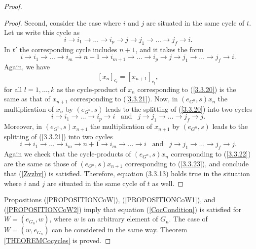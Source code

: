 \documentclass[12pt]{amsart}
\theoremstyle{definition}
\numberwithin{equation}{section}
\begin{document}
\begin{proof}
\begin{proof}
Second, consider the case where $i$ and $j$ are situated in the same cycle of $t$. Let us write this cycle as
\begin{equation}\label{3.3.20}
i\rightarrow i_1\rightarrow\ldots\rightarrow i_p\rightarrow j\rightarrow j_{1}\rightarrow
\ldots\rightarrow j_f\rightarrow i.
\end{equation}
In $t'$ the corresponding cycle includes $n+1$, and it takes the form
\begin{equation}\label{3.3.21}
i\rightarrow i_1\rightarrow\ldots\rightarrow i_{m}\rightarrow n+1\rightarrow i_{m+1}\rightarrow\ldots
\rightarrow i_p\rightarrow j\rightarrow j_{1}\rightarrow
\ldots\rightarrow j_f\rightarrow i.
\end{equation}
Again, we have
\begin{equation}
\left[x_{n}\right]_{c_l}=\left[x_{n+1}\right]_{c_l},
\end{equation}
for all $l=1,\ldots,k$ as the cycle-product of $x_n$ corresponding to (\ref{3.3.20}) is the same as that of $x_{n+1}$ corresponding to (\ref{3.3.21}). Now, in $\left(e_{G^n},s\right)x_{n}$ the multiplication of $x_n$ by $\left(e_{G^n},s\right)$ leads to the splitting of (\ref{3.3.20}) into two cycles
\begin{equation}\label{3.3.22}
i\rightarrow i_1\rightarrow\ldots\rightarrow i_p\rightarrow i\;\;\; \mbox{and}\;\;\; j\rightarrow j_{1}\rightarrow
\ldots\rightarrow j_f\rightarrow j.
\end{equation}
Moreover, in $\left(e_{G^n},s\right)x_{n+1}$ the multiplication of $x_{n+1}$ by $\left(e_{G^n},s\right)$ leads to the splitting of (\ref{3.3.21}) into two cycles
\begin{equation}\label{3.3.23}
i\rightarrow i_1\rightarrow\ldots\rightarrow i_m\rightarrow n+1\rightarrow i_m\rightarrow\ldots\rightarrow i\;\;\; \mbox{and}\;\;\; j\rightarrow j_{1}\rightarrow
\ldots\rightarrow j_f\rightarrow j.
\end{equation}
Again we check that the cycle-products of   $\left(e_{G^n},s\right)x_n$ corresponding to (\ref{3.3.22}) are the same as those of $\left(e_{G^n},s\right)x_{n+1}$ corresponding to (\ref{3.3.23}), and conclude that
(\ref{Zvzbv}) is satisfied. Therefore, equation (3.3.13) holds true in the situation where $i$ and $j$ are situated in the same cycle of $t$ as well.
\end{proof}
Propositions (\ref{PROPOSITIONCoW}), (\ref{PROPOSITIONCoW1}), and (\ref{PROPOSITIONCoW2}) imply that equation (\ref{CocCondition}) is satisfied for $W=\left(e_{G_n},w\right)$, where $w$ is an arbitrary element of $G_n$. The case of  $W=\left(w,e_{G_n}\right)$ can be considered in the same way.
Theorem \ref{THEOREMCocycles} is proved.
\end{proof}
\end{document}
